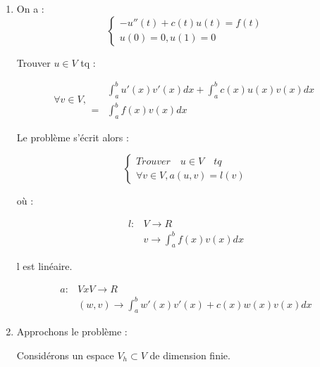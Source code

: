 \documentclass[12pt, letterpaper]{article}
\begin{document}
\begin{enumerate}

\item On a :
  \begin{equation*}
    \left\{
    \begin{array}{l}
      -u''(t) + c(t) u(t) = f(t) \\
      u(0) = 0, u(1) = 0
    \end{array}
    \right.
  \end{equation*}
  
  Trouver $u \in V$ tq :

  \begin{equation*}
    \forall v \in V,
    \begin{split}
      & \int_{a}^{b}{u'(x) v'(x) dx} + \int_{a}^{b}{c(x) u(x) v(x) dx} \\
      = & \int_{a}^{b}{f(x) v(x) dx}
    \end{split}
  \end{equation*}

  Le problème s'écrit alors :

  \begin{equation*}
    \left\{
    \begin{array}{l}
      Trouver \quad u \in V \quad tq \\
      \forall v \in V, a(u, v) = l(v)
    \end{array}
    \right.
  \end{equation*}

  où :
  
  \begin{equation*}
    \begin{array}{ll}
      l : & V \rightarrow R \\
      & v \rightarrow \int_{a}^{b}{f(x) v(x) dx}
    \end{array}
  \end{equation*}

  l est linéaire.

  \begin{equation*}
    \begin{array}{ll}
      a : & V x V \rightarrow R \\
      & (w, v) \rightarrow \int_{a}^{b}{w'(x) v'(x) + c(x) w(x) v(x) dx}
    \end{array}
  \end{equation*}

\item Approchons le problème :

  Considérons un espace $V_h \subset V$ de dimension finie.


\end{enumerate}
\end{document}
